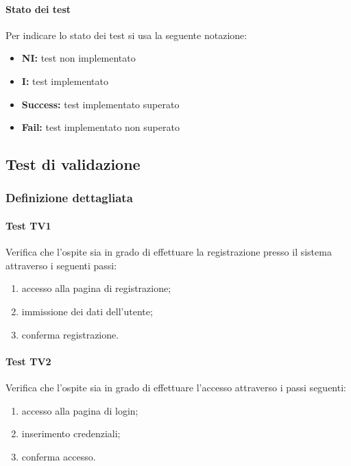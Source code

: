 \documentclass[12pt,a4paper]{article}
\begin{document}
	\paragraph{Stato dei test}
	Per indicare lo stato dei test si usa la seguente notazione:

	\begin{itemize}
		\item \textbf{NI:} test non implementato
		\item \textbf{I:} test implementato
		\item \textbf{Success:} test implementato superato
		\item \textbf{Fail:} test implementato non superato
	\end{itemize}
		
\subsection{Test di validazione}\label{test_pianificazione}
\subsubsection{Definizione dettagliata}
	\hypertarget{TV1}{}
	\paragraph{Test TV1}
	Verifica che l'ospite sia in grado di effettuare la registrazione presso il sistema attraverso i seguenti passi:
	
	\begin{enumerate}
		\item accesso alla pagina di registrazione;
		\item immissione dei dati dell'utente;
		\item conferma registrazione.
	\end{enumerate}
	\hypertarget{TV2}{}
	\paragraph{Test TV2}
	Verifica che l'ospite sia in grado di effettuare l'accesso attraverso i passi seguenti:
	
	\begin{enumerate}
		\item accesso alla pagina di login;
		\item inserimento credenziali;
		\item conferma accesso.
	\end{enumerate}
	\hypertarget{TV3}{}
\end{document}
